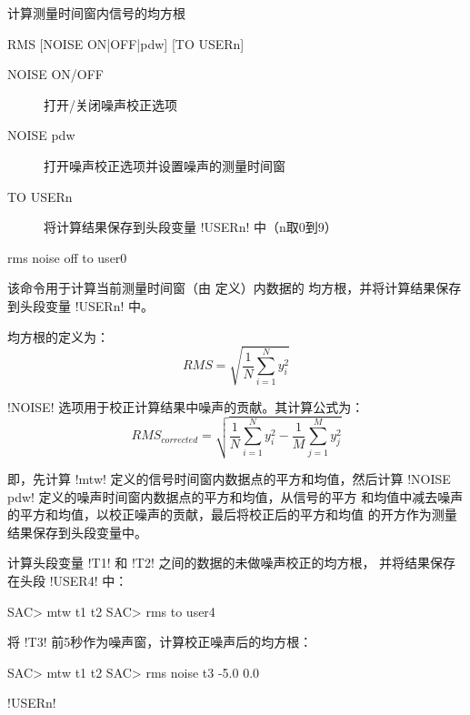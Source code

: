 \label{cmd:rms}

计算测量时间窗内信号的均方根

\begin{SACSTX}
RMS [NOISE ON|OFF|pdw] [TO USERn]
\end{SACSTX}

\begin{description}
\item [NOISE ON/OFF] 打开/关闭噪声校正选项
\item [NOISE pdw] 打开噪声校正选项并设置噪声的测量时间窗 
\item [TO USERn] 将计算结果保存到头段变量 !USERn! 中（n取0到9）
\end{description}

\begin{SACDFT}
rms noise off to user0
\end{SACDFT}

该命令用于计算当前测量时间窗（由  定义）内数据的
均方根，并将计算结果保存到头段变量 !USERn! 中。

均方根的定义为：
\[
 RMS = \sqrt{\frac{1}{N} \sum_{i=1}^N y_i^2}
\]

!NOISE! 选项用于校正计算结果中噪声的贡献。其计算公式为：
\[
    RMS_{corrected} = \sqrt{\frac{1}{N} \sum_{i=1}^N y_i^2 -
            \frac{1}{M} \sum_{j=1}^M y_j^2}
\]

即，先计算 !mtw! 定义的信号时间窗内数据点的平方和均值，然后计算
!NOISE pdw! 定义的噪声时间窗内数据点的平方和均值，从信号的平方
和均值中减去噪声的平方和均值，以校正噪声的贡献，最后将校正后的平方和均值
的开方作为测量结果保存到头段变量中。

计算头段变量 !T1! 和 !T2! 之间的数据的未做噪声校正的均方根，
并将结果保存在头段 !USER4! 中：
\begin{SACCode}
SAC> mtw t1 t2
SAC> rms to user4
\end{SACCode}

将 !T3! 前5秒作为噪声窗，计算校正噪声后的均方根：
\begin{SACCode}
SAC> mtw t1 t2
SAC> rms noise t3 -5.0 0.0
\end{SACCode}

!USERn!
